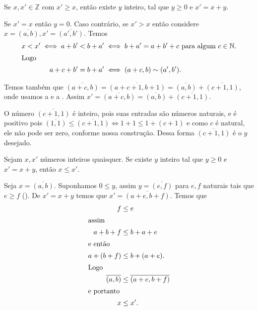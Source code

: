 \documentclass[../main.tex]{subfiles}
\begin{document}
\begin{prop}\label{int-prop-diferencaPositiva}
    Se $x,x' \in \mathbb{Z}$ com $x' \geq x$, então existe $y$ inteiro, tal que $y \geq 0$ e $x' = x+y$.
\end{prop}
\begin{dem}
    Se $x' = x$ então $y=0$.
    Caso contrário, se $x'>x$ então considere $x = \overline{(a,b)}, x'=\overline{(a',b')}$. Temos 
    \begin{align*}
        x < x' \iff a+b' < b + a' &\iff b+a' = a+b'+c \text{ para algum } c \in \mathbb{N}. \\ \shortintertext{Logo}
        a+c+b' = b+a' &\iff (a+c,b) \sim (a',b').
    \end{align*}

    Temos também que $\overline{(a+c,b)} = \overline{(a+c+1,b+1)} = \overline{(a,b)} + \overline{(c+1, 1)}$, onde usamos a  e a . Assim $x' = \overline{(a+c,b)} = \overline{(a,b)} + \overline{(c+1,1)}$.

    O número $\overline{(c+1,1)}$ é inteiro, pois suas entradas são números naturais, e é positivo pois $\overline{(1,1)} \leq \overline{(c+1,1)} 
    \iff 1+1 \leq 1+(c+1)$ e como $c$ é natural, ele não pode ser zero, conforme nossa construção. Dessa forma $\overline{(c+1,1)}$ é o $y$ desejado.
\end{dem}

\begin{prop}\label{int-prop-diferencaPositivaII}
    Sejam $x, x'$ números inteiros quaisquer. Se existe $y$ inteiro tal que $y \geq 0$ e $x' = x+y$, então $x \leq x'$.    
\end{prop}
\begin{dem}
    Seja $x = \overline{(a,b)}$.
    Suponhamos $0 \leq y$, assim $y = \overline{(e,f)}$ para $e,f$ naturais tais que $e \geq f$ (). 
    De $x' = x + y$ temos que $x' = \overline{(a+e,b+f)}$. Temos que 
    \begin{align*}
        f &\leq e \\ \shortintertext{assim}
        a+b+f &\leq b+a+e \\ \shortintertext{e então}
        a+(b+f) &\leq b+ (a+e). \\ \shortintertext{Logo}
        \overline{(a,b)} &\leq \overline{(a+e,b+f)} \\ \shortintertext{e portanto}
        x &\leq x'.
    \end{align*}
\end{dem}
\end{document}
